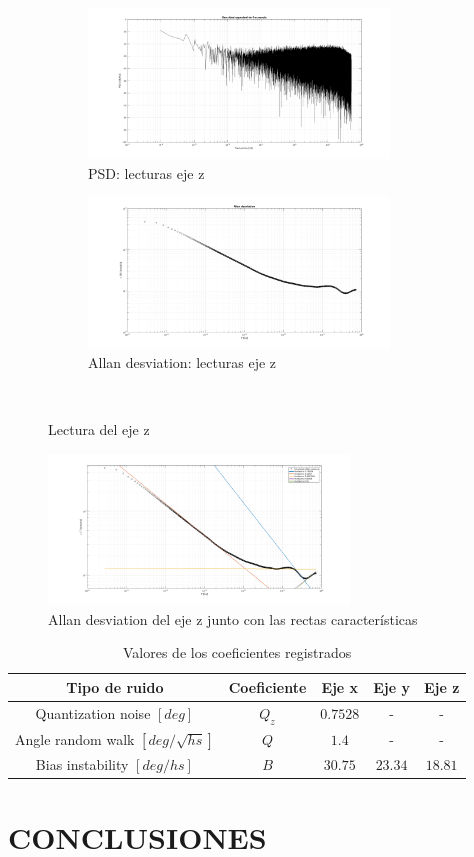 \documentclass[a4paper,11pt,twoside]{IT-CNEA}
\begin{document}
\begin{figure}[t!]
    \centering
    \begin{subfigure}[t]{0.5\textwidth}
        \centering
        \includegraphics[width=8cm]{Figuras/PSDGyroz.png}
        \caption{PSD: lecturas eje z}
        \label{fig:}
    \end{subfigure}%
    \begin{subfigure}[t]{0.5\textwidth}
        \centering
        \includegraphics[width=8cm]{Figuras/AllanGyroz.png}
        \caption{Allan desviation: lecturas eje z}
        \label{fig:}
    \end{subfigure}%
    ~ 
    \caption{Lectura del eje z}
    \label{fig:lecturasEjez}
\end{figure}
\begin{figure}[h!]
\centering
\includegraphics[width=8cm]{Figuras/AllanGyrozRectas.png}
\caption{Allan desviation del eje z junto con las rectas características}
\label{fig:lecturaEjezRectas}
\end{figure}
\begin{table}[h!]
\centering
\caption{Valores de los coeficientes registrados}
\label{tabla:valoresCoeficientesEjes}
\begin{tabular}{|c|c|c|c|c|}
\hline
Tipo de ruido&Coeficiente& Eje x & Eje y & Eje z \\ \hline
Quantization noise $\left[ deg\right]$&$Q_z$&$0.7528$&-&- \\ \hline
Angle random walk $\left[ deg/\sqrt{hs}\right]$&$Q$&$1.4$&-&-\\ \hline
Bias instability $\left[ deg/hs \right]$&$B$&$30.75$ &$23.34$ &$18.81$\\ \hline
\end{tabular}
\end{table}
\section{CONCLUSIONES}
\newpage


\end{document}
